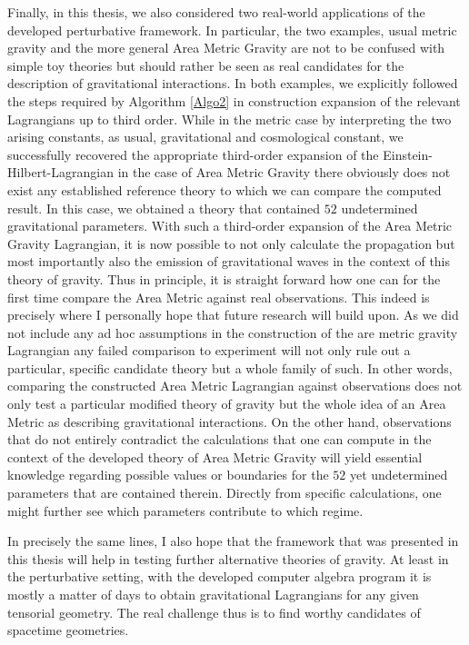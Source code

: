 Finally, in this thesis, we also considered two real-world applications of the developed perturbative framework. In particular, the two examples, usual metric gravity and the more general Area Metric Gravity are not to be confused with simple toy theories but should rather be seen as real candidates for the description of gravitational interactions. In both examples, we explicitly followed the steps required by Algorithm \ref{Algo2} in construction expansion of the relevant Lagrangians up to third order. While in the metric case by interpreting the two arising constants, as usual, gravitational and cosmological constant, we successfully recovered the appropriate third-order expansion of the Einstein-Hilbert-Lagrangian in the case of Area Metric Gravity there obviously does not exist any established reference theory to which we can compare the computed result. In this case, we obtained a theory that contained $52$ undetermined gravitational parameters. 
With such a third-order expansion of the Area Metric Gravity Lagrangian, it is now possible to not only calculate the propagation but most importantly also the emission of gravitational waves in the context of this theory of gravity. Thus in principle, it is straight forward how one can for the first time compare the Area Metric against real observations. This indeed is precisely where I personally hope that future research will build upon. 
As we did not include any ad hoc assumptions in the construction of the are metric gravity Lagrangian any failed comparison to experiment will not only rule out a particular, specific candidate theory but a whole family of such. In other words, comparing the constructed Area Metric Lagrangian against observations does not only test a particular modified theory of gravity but the whole idea of an Area Metric as describing gravitational interactions. 
On the other hand, observations that do not entirely contradict the calculations that one can compute in the context of the developed theory of Area Metric Gravity will yield essential knowledge regarding possible values or boundaries for the $52$ yet undetermined parameters that are contained therein. 
Directly from specific calculations, one might further see which parameters contribute to which regime. 

In precisely the same lines, I also hope that the framework that was presented in this thesis will help in testing further alternative theories of gravity. At least in the perturbative setting, with the developed computer algebra program it is mostly a matter of days to obtain gravitational Lagrangians for any given tensorial geometry. The real challenge thus is to find worthy candidates of spacetime geometries. 

